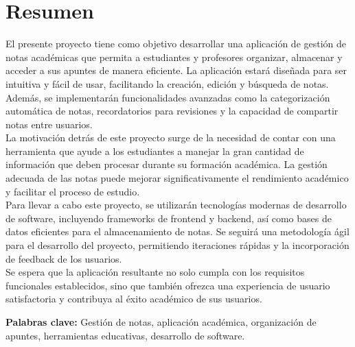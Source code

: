 \chapter*{Resumen}
\thispagestyle{fancy}
El presente proyecto tiene como objetivo desarrollar una aplicación de gestión de notas académicas que permita a estudiantes y profesores organizar, almacenar y acceder a sus apuntes de manera eficiente. La aplicación estará diseñada para ser intuitiva y fácil de usar, facilitando la creación, edición y búsqueda de notas. Además, se implementarán funcionalidades avanzadas como la categorización automática de notas, recordatorios para revisiones y la capacidad de compartir notas entre usuarios.\\
La motivación detrás de este proyecto surge de la necesidad de contar con una herramienta que ayude a los estudiantes a manejar la gran cantidad de información que deben procesar durante su formación académica. La gestión adecuada de las notas puede mejorar significativamente el rendimiento académico y facilitar el proceso de estudio.\\
Para llevar a cabo este proyecto, se utilizarán tecnologías modernas de desarrollo de software, incluyendo frameworks de frontend y backend, así como bases de datos eficientes para el almacenamiento de notas. Se seguirá una metodología ágil para el desarrollo del proyecto, permitiendo iteraciones rápidas y la incorporación de feedback de los usuarios.\\
Se espera que la aplicación resultante no solo cumpla con los requisitos funcionales establecidos, sino que también ofrezca una experiencia de usuario satisfactoria y contribuya al éxito académico de sus usuarios.

\vspace{1cm}
\textbf{Palabras clave:} Gestión de notas, aplicación académica, organización de apuntes, herramientas educativas, desarrollo de software.

